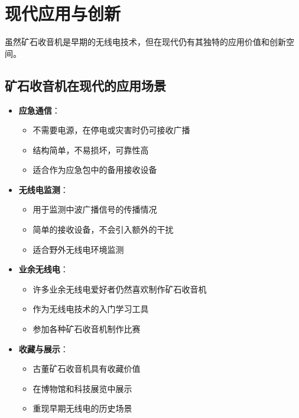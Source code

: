 \documentclass[12pt,UTF8]{ctexbook}
\begin{document}
\section{现代应用与创新}

虽然矿石收音机是早期的无线电技术，但在现代仍有其独特的应用价值和创新空间。

\subsection{矿石收音机在现代的应用场景}

\begin{itemize}[leftmargin=3.5em]
    \item \textbf{应急通信}：
        \begin{itemize}[leftmargin=3.5em]
            \item 不需要电源，在停电或灾害时仍可接收广播
            \item 结构简单，不易损坏，可靠性高
            \item 适合作为应急包中的备用接收设备
        \end{itemize}
    \item \textbf{无线电监测}：
        \begin{itemize}[leftmargin=3.5em]
            \item 用于监测中波广播信号的传播情况
            \item 简单的接收设备，不会引入额外的干扰
            \item 适合野外无线电环境监测
        \end{itemize}
    \item \textbf{业余无线电}：
        \begin{itemize}[leftmargin=3.5em]
            \item 许多业余无线电爱好者仍然喜欢制作矿石收音机
            \item 作为无线电技术的入门学习工具
            \item 参加各种矿石收音机制作比赛
        \end{itemize}
    \item \textbf{收藏与展示}：
        \begin{itemize}[leftmargin=3.5em]
            \item 古董矿石收音机具有收藏价值
            \item 在博物馆和科技展览中展示
            \item 重现早期无线电的历史场景
        \end{itemize}
\end{itemize}
\end{document}
